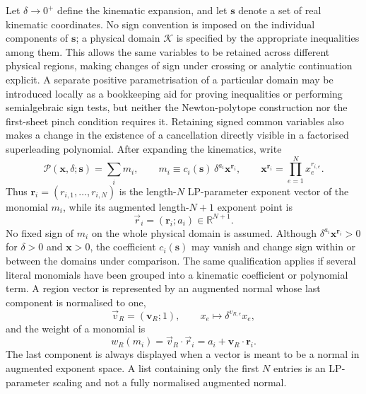 \documentclass[a4paper,11pt]{article}
\newcommand{\x}{\boldsymbol{x}}
\newcommand{\s}{\boldsymbol{s}}
\newcommand{\K}{\mathcal K}
\begin{document}
Let \(\delta\to0^+\) define the kinematic expansion, and let \(\s\) denote a
set of real kinematic coordinates.  No sign convention is imposed on the
individual components of \(\s\); a physical domain \(\K\) is specified by
the appropriate inequalities among them.  This allows the same variables to
be retained across different physical regions, making changes of sign under
crossing or analytic continuation explicit.  A separate positive
parametrisation of a particular domain may be introduced locally as a
bookkeeping aid for proving inequalities or performing semialgebraic sign
tests, but neither the Newton-polytope construction nor the first-sheet pinch
condition requires it.  Retaining signed common variables also makes a
change in the existence of a cancellation directly visible in a factorised
superleading polynomial.  After expanding the kinematics, write
\begin{equation}
 \mathcal P(\x,\delta;\s)
 =
 \sum_i m_i,
 \qquad
 m_i\equiv
 c_i(\s)\,
 \delta^{a_i}\x^{\boldsymbol r_i},
 \qquad
 \x^{\boldsymbol r_i}
 =\prod_{e=1}^{N}x_e^{r_{i,e}}.
\label{eq:Pmonomials}
\end{equation}
Thus
\(\boldsymbol r_i=(r_{i,1},\ldots,r_{i,N})\) is the length-\(N\)
LP-parameter exponent vector of the monomial \(m_i\), while its augmented
length-\(N+1\) exponent point is
\begin{equation}
 \vec r_i=(\boldsymbol r_i;a_i)\in\mathbb R^{N+1}.
\end{equation}
No fixed sign of \(m_i\) on the whole physical domain is assumed.  Although
\(\delta^{a_i}\x^{\boldsymbol r_i}>0\) for \(\delta>0\) and \(\x>0\), the
coefficient \(c_i(\s)\) may vanish and change sign within or between the
domains under comparison.  The same qualification applies if several literal monomials have
been grouped into a kinematic coefficient or polynomial term.
A region vector is represented by an augmented normal whose last component
is normalised to one,
\begin{equation}
 \vec v_R=(\boldsymbol v_R;1),
 \qquad
 x_e\longmapsto \delta^{v_{R,e}}x_e,
\label{eq:regionvector}
\end{equation}
and the weight of a monomial is
\begin{equation}
 w_R(m_i)=\vec v_R\cdot\vec r_i
 =a_i+\boldsymbol v_R\cdot\boldsymbol r_i.
\label{eq:weight}
\end{equation}
The last component is always displayed when a vector is meant to be a
normal in augmented exponent space.  A list containing only the first \(N\)
entries is an LP-parameter scaling and not a fully normalised augmented
normal.
\end{document}
